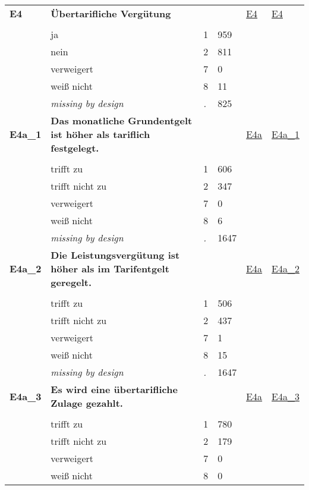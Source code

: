 \begin{longtable}{| L{2.45cm} | L{6cm} | C{1.5cm} | R{1cm} | C{2.25cm} | C{2.25cm} |}
   \midrule
\textbf{E4}\label{var:E4} & \textbf{Übertarifliche Vergütung} &  &  & \hyperref[E4]{E4} & \hyperref[var:suf:E4]{E4} \\ 
   &  &  &  &  &  \\ 
   & ja & 1 & 959 &  &  \\ 
   & nein & 2 & 811 &  &  \\ 
   & verweigert & 7 & 0 &  &  \\ 
   & weiß nicht & 8 & 11 &  &  \\ 
   & \textit{missing by design} & \textit{.} & 825 &  &  \\ 
   \midrule
\textbf{E4a\_1}\label{var:E4a:1} & \textbf{Das monatliche Grundentgelt ist höher als tariflich festgelegt.} &  &  & \hyperref[E4a]{E4a} & \hyperref[var:suf:E4a:1]{E4a\_1} \\ 
   &  &  &  &  &  \\ 
   & trifft zu & 1 & 606 &  &  \\ 
   & trifft nicht zu & 2 & 347 &  &  \\ 
   & verweigert & 7 & 0 &  &  \\ 
   & weiß nicht & 8 & 6 &  &  \\ 
   & \textit{missing by design} & \textit{.} & 1647 &  &  \\ 
   \midrule
\textbf{E4a\_2}\label{var:E4a:2} & \textbf{Die Leistungsvergütung ist höher als im Tarifentgelt geregelt.} &  &  & \hyperref[E4a]{E4a} & \hyperref[var:suf:E4a:2]{E4a\_2} \\ 
   &  &  &  &  &  \\ 
   & trifft zu & 1 & 506 &  &  \\ 
   & trifft nicht zu & 2 & 437 &  &  \\ 
   & verweigert & 7 & 1 &  &  \\ 
   & weiß nicht & 8 & 15 &  &  \\ 
   & \textit{missing by design} & \textit{.} & 1647 &  &  \\ 
   \midrule
\textbf{E4a\_3}\label{var:E4a:3} & \textbf{Es wird eine übertarifliche Zulage gezahlt.} &  &  & \hyperref[E4a]{E4a} & \hyperref[var:suf:E4a:3]{E4a\_3} \\ 
   &  &  &  &  &  \\ 
   & trifft zu & 1 & 780 &  &  \\ 
   & trifft nicht zu & 2 & 179 &  &  \\ 
   & verweigert & 7 & 0 &  &  \\ 
   & weiß nicht & 8 & 0 &  &  \\ 

\end{longtable}
